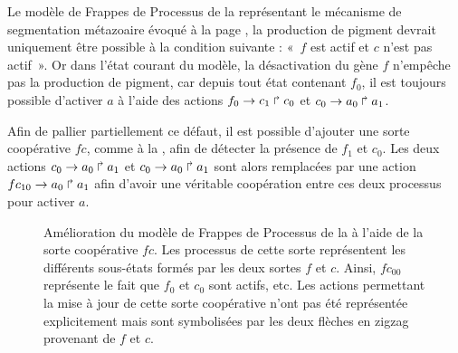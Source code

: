 \begin{example}
  Le modèle de Frappes de Processus de la 
  représentant le mécanisme de segmentation métazoaire évoqué à la page
  ,
  la production de pigment devrait uniquement être possible à la condition suivante :
  «~$f$ est actif et $c$ n'est pas actif~».
  Or dans l'état courant du modèle,
  la désactivation du gène $f$ n'empêche pas la production de pigment,
  car depuis tout état contenant $f_0$, il est toujours possible d'activer $a$
  à l'aide des actions $f_0\rightarrow c_1\Rsh c_0$ et $c_0\rightarrow a_0\Rsh a_1$.
  
  Afin de pallier partiellement ce défaut, il est possible d'ajouter une sorte coopérative $fc$,
  comme à la ,
  afin de détecter la présence de $f_1$ et $c_0$.
  Les deux actions $c_0\rightarrow a_0\Rsh a_1$ et $c_0\rightarrow a_0\Rsh a_1$
  sont alors remplacées par une action $fc_{10}\rightarrow a_0\Rsh a_1$
  afin d'avoir une véritable coopération entre ces deux processus pour activer $a$.
  
  \begin{figure}[ht]
  \begin{center}
  \caption{%
    Amélioration du modèle de Frappes de Processus de la 
    à l'aide de la sorte coopérative $fc$.
    Les processus de cette sorte représentent les différents sous-états formés par les
    deux sortes $f$ et $c$.
    Ainsi, $fc_{00}$ représente le fait que $f_0$ et $c_0$ sont actifs, etc.
    Les actions permettant la mise à jour de cette sorte coopérative n'ont pas
    été représentée explicitement mais sont symbolisées par les deux flèches
    en zigzag provenant de $f$ et $c$.
  }
  \end{center}
  \end{figure}
\end{example}

